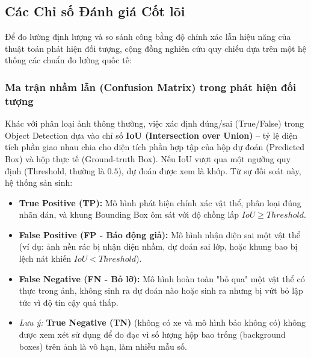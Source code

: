 \documentclass[a4paper]{article}
\theoremstyle{definition}
\begin{document}
\subsection{Các Chỉ số Đánh giá Cốt lõi}
Để đo lường định lượng và so sánh công bằng độ chính xác lẫn hiệu năng của thuật toán phát hiện đối tượng, cộng đồng nghiên cứu quy chiếu dựa trên một hệ thống các chuẩn đo lường quốc tế:

\subsubsection{Ma trận nhầm lẫn (Confusion Matrix) trong phát hiện đối tượng}
Khác với phân loại ảnh thông thường, việc xác định đúng/sai (True/False) trong Object Detection dựa vào chỉ số \textbf{IoU (Intersection over Union)} – tỷ lệ diện tích phần giao nhau chia cho diện tích phần hợp tập của hộp dự đoán (Predicted Box) và hộp thực tế (Ground-truth Box). Nếu IoU vượt qua một ngưỡng quy định (Threshold, thường là $0.5$), dự đoán được xem là khớp. Từ sự đối soát này, hệ thống sản sinh:
\begin{itemize}
	\item \textbf{True Positive (TP):} Mô hình phát hiện chính xác vật thể, phân loại đúng nhãn dán, và khung Bounding Box ôm sát với độ chồng lấp $IoU \ge Threshold$.
	\item \textbf{False Positive (FP - Báo động giả):} Mô hình nhận diện sai một vật thể (ví dụ: ảnh nền rác bị nhận diện nhầm, dự đoán sai lớp, hoặc khung bao bị lệch nát khiến $IoU < Threshold$).
	\item \textbf{False Negative (FN - Bỏ lỡ):} Mô hình hoàn toàn "bỏ qua" một vật thể có thực trong ảnh, không sinh ra dự đoán nào hoặc sinh ra nhưng bị vứt bỏ lập tức vì độ tin cậy quá thấp.
	\item \textit{Lưu ý:} \textbf{True Negative (TN)} (không có xe và mô hình bảo không có) không được xem xét sử dụng để đo đạc vì số lượng hộp bao trống (background boxes) trên ảnh là vô hạn, làm nhiễu mẫu số.
\end{itemize}
\end{document}

